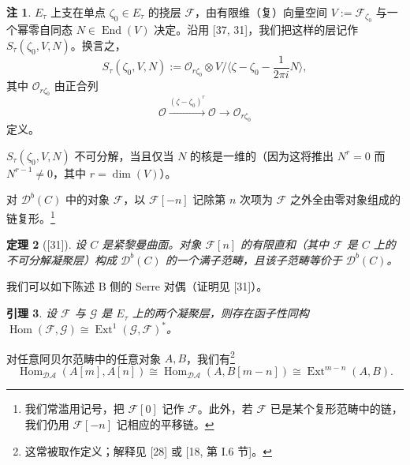 \documentclass[11pt,a4paper]{article}
\theoremstyle{plain}
\newtheorem{theorem}{定理}[section]
\newtheorem{lemma}[theorem]{引理}
\theoremstyle{definition}
\newtheorem{remark}[theorem]{注}
\begin{document}
\begin{remark}
$E_\tau$ 上支在单点 $\zeta_0\in E_\tau$ 的挠层 $\mathcal{F}$，由有限维（复）向量空间 $V:=\mathcal{F}_{\zeta_0}$ 与一个幂零自同态 $N\in\operatorname{End}(V)$ 决定。沿用 [37, 31]，我们把这样的层记作 $S_\tau(\zeta_0,V,N)$。换言之，
\[
  S_\tau(\zeta_0,V,N):=\mathcal{O}_{r\zeta_0}\otimes V\big/\bigl\langle
  \zeta-\zeta_0-\frac{1}{2\pi i}N\bigr\rangle,
\]
其中 $\mathcal{O}_{r\zeta_0}$ 由正合列
\[
  \mathcal{O}\xrightarrow{(\zeta-\zeta_0)^r}\mathcal{O}\to\mathcal{O}_{r\zeta_0}
\]
定义。

$S_\tau(\zeta_0,V,N)$ 不可分解，当且仅当 $N$ 的核是一维的（因为这将推出 $N^r=0$ 而 $N^{r-1}\neq0$，其中 $r=\dim(V)$）。
\end{remark}


对 $\mathcal{D}^b(C)$ 中的对象 $\mathcal{F}$，以 $\mathcal{F}[-n]$ 记除第 $n$ 次项为 $\mathcal{F}$ 之外全由零对象组成的链复形。\footnote{我们常滥用记号，把 $\mathcal{F}[0]$ 记作 $\mathcal{F}$。此外，若 $\mathcal{F}$ 已是某个复形范畴中的链，我们仍用 $\mathcal{F}[-n]$ 记相应的平移链。}

\begin{theorem}[{[31]}]
设 $C$ 是紧黎曼曲面。对象 $\mathcal{F}[n]$ 的有限直和（其中 $\mathcal{F}$ 是 $C$ 上的不可分解凝聚层）构成 $\mathcal{D}^b(C)$ 的一个满子范畴，且该子范畴等价于 $\mathcal{D}^b(C)$。
\end{theorem}

我们可以如下陈述 B 侧的 Serre 对偶（证明见 [31]）。

\begin{lemma}
设 $\mathcal{F}$ 与 $\mathcal{G}$ 是 $E_\tau$ 上的两个凝聚层，则存在函子性同构 $\operatorname{Hom}(\mathcal{F},\mathcal{G})\cong\operatorname{Ext}^1(\mathcal{G},\mathcal{F})^*$。
\end{lemma}

对任意阿贝尔范畴中的任意对象 $A,B$，我们有\footnote{这常被取作定义；解释见 [28] 或 [18, 第 I.6 节]。}
\[
  \operatorname{Hom}_{\mathcal{D}\mathcal{A}}(A[m],A[n])
  \cong\operatorname{Hom}_{\mathcal{D}\mathcal{A}}(A,B[m-n])
  \cong\operatorname{Ext}^{m-n}(A,B).
\]

\end{document}

